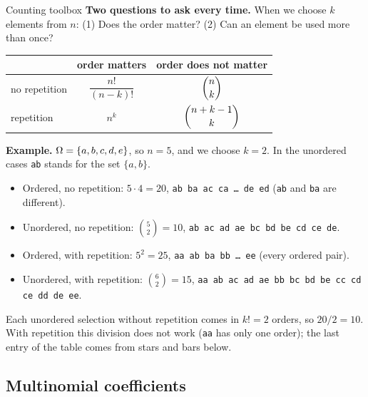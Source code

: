 \begin{key}{Counting toolbox}
	\textbf{Two questions to ask every time.} When we choose $k$ elements from
	$n$: (1) Does the order matter? (2) Can an element be used more than once?
	\begin{center}
		\begin{tabular}{lcc}
			\toprule
			              & order matters        & order does not matter \\\midrule
			no repetition & $\dfrac{n!}{(n-k)!}$ & $\dbinom nk$          \\[4mm]
			repetition    & $n^k$                & $\dbinom{n+k-1}{k}$   \\\bottomrule
		\end{tabular}
	\end{center}
	\textbf{Example.} $\Omega=\{a,b,c,d,e\}$, so $n=5$, and we choose $k=2$. In
	the unordered cases \texttt{ab} stands for the set $\{a,b\}$.
	\begin{itemize}[nosep]
		\item Ordered, no repetition: $5\cdot4=20$, \texttt{ab ba ac ca \dots\
			      de ed} (\texttt{ab} and \texttt{ba} are different).
		\item Unordered, no repetition: $\binom52=10$, \texttt{ab ac ad ae bc bd
			      be cd ce de}.
		\item Ordered, with repetition: $5^2=25$, \texttt{aa ab ba bb \dots\ ee}
		      (every ordered pair).
		\item Unordered, with repetition: $\binom62=15$, \texttt{aa ab ac ad ae
			      bb bc bd be cc cd ce dd de ee}.
	\end{itemize}
	Each unordered selection without repetition comes in $k!=2$ orders, so
	$20/2=10$. With repetition this division does not work (\texttt{aa} has
	only one order); the last entry of the table comes from stars and bars
	below.
\end{key}

\subsection*{Multinomial coefficients}

